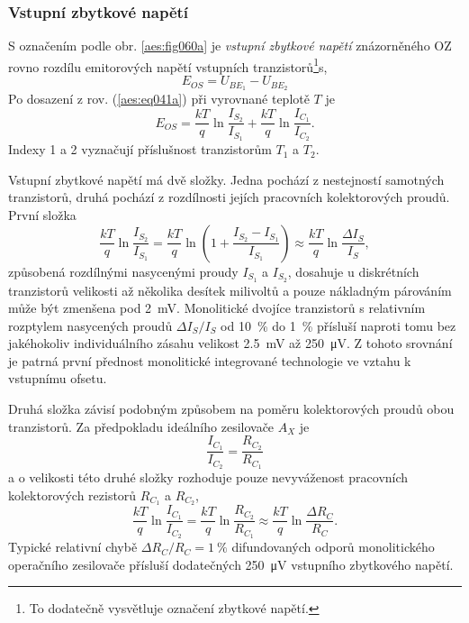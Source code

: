       \subsubsection{Vstupní zbytkové napětí}\label{aesIchIIIsecIIIssecVI}
        S označením podle obr. \ref{aes:fig060a} je \emph{vstupní zbytkové napětí} znázorněného OZ
        rovno rozdílu emitorových napětí vstupních tranzistorů\footnote{To dodatečně vysvětluje
        označení zbytkové napětí.}s,
        \begin{equation*}
          E_{OS} = U_{BE_1} - U_{BE_2}
        \end{equation*}
        Po dosazení z rov. (\ref{aes:eq041a}) při vyrovnané teplotě \(T\) je
        \begin{equation}\label{aes:eq046}
          E_{OS}  = \dfrac{kT}{q}\ln\dfrac{I_{S_2}}{I_{S_1}} + 
                    \dfrac{kT}{q}\ln\dfrac{I_{C_1}}{I_{C_2}}. 
        \end{equation}
        Indexy 1 a 2 vyznačují příslušnost tranzistorům \(T_1\) a \(T_2\).

        Vstupní zbytkové napětí má dvě složky. Jedna pochází z nestejností samotných tranzistorů,
        druhá pochází z rozdílnosti jejích pracovních kolektorových proudů. První složka
        \begin{equation}\label{aes:eq047}
          \dfrac{kT}{q}\ln\dfrac{I_{S_2}}{I_{S_1}} = 
          \dfrac{kT}{q}\ln\left(1+\dfrac{I_{S_2} - I_{S_1}}{I_{S_1}}\right) \approx 
          \dfrac{kT}{q}\ln\dfrac{\Delta I_{S}}{I_{S}}, 
        \end{equation}
        způsobená rozdílnými nasycenými proudy \(I_{S_1}\) a \(I_{S_2}\), dosahuje u diskrétních
        tranzistorů velikosti až několika desítek milivoltů a pouze nákladným párováním může být
        zmenšena pod \qty{2}{\mV}. Monolitické dvojíce tranzistorů s relativním rozptylem nasycených
        proudů \(\Delta I_S/I_S\) od \qty{10}{\percent} do \qty{1}{\percent} přísluší naproti tomu bez
        jakéhokoliv individuálního zásahu velikost \qty{2.5}{\mV} až \qty{250}{\uV}. Z tohoto srovnání
        je patrná první přednost monolitické integrované technologie ve vztahu k vstupnímu ofsetu.

        Druhá složka závisí podobným způsobem na poměru kolektorových proudů obou tranzistorů. Za
        předpokladu ideálního zesilovače \(A_X\) je
        \begin{equation}\label{aes:eq048}
          \dfrac{I_{C_1}}{I_{C_2}} = \dfrac{R_{C_2}}{R_{C_1}} 
        \end{equation}
        a o velikosti této druhé složky rozhoduje pouze nevyváženost pracovních kolektorových
        rezistorů \(R_{C_1}\) a \(R_{C_2}\),
        \begin{equation}\label{aes:eq049}
          \dfrac{kT}{q}\ln\dfrac{I_{C_1}}{I_{C_2}} = \dfrac{kT}{q}\ln\dfrac{R_{C_2}}{R_{C_1}}
          \approx\dfrac{kT}{q}\ln\dfrac{\Delta R_C}{R_C}.
        \end{equation}
        Typické relativní chybě \(\Delta R_C/R_C = \qty{1}{\percent}\) difundovaných odporů
        monolitického operačního zesilovače přísluší dodatečných \qty{250}{\uV} vstupního zbytkového
        napětí.

